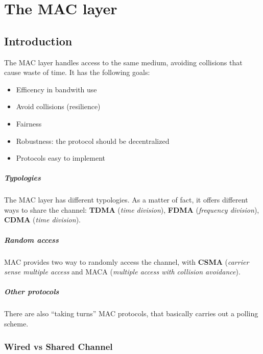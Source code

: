 \chapter{The MAC layer}

\section{Introduction}

The MAC layer handles access to the same medium, avoiding collisions that cause
waste of time.
It has the following goals:
\begin{itemize}
\item Efficency in bandwith use
\item Avoid collisions (resilience)
\item Fairness
\item Robustness: the protocol should be decentralized
\item Protocols easy to implement
\end{itemize}

\paragraph*{Typologies} The MAC layer has different typologies. As a matter of
fact, it offers different
ways to share the channel: \textbf{TDMA} (\textit{time division}), \textbf{FDMA}
(\textit{frequency division}), \textbf{CDMA} (\textit{time division}).
\paragraph*{Random access} MAC provides two way to randomly access the channel,
with \textbf{CSMA}
(\textit{carrier sense multiple access} and MACA (\textit{multiple access with
  collision avoidance}).
\paragraph*{Other protocols} There are also ``taking turns'' MAC protocols, that
basically carries out a
polling scheme.

\subsection{Wired vs Shared Channel}

